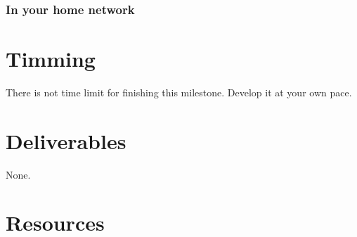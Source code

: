 \begin{enumerate}
\begin{enumerate}
\end{enumerate}

\subsubsection{In your home network}

\section{Timming}

There is not time limit for finishing this milestone. Develop it at
your own pace.

\section{Deliverables}

None.

\section{Resources}


